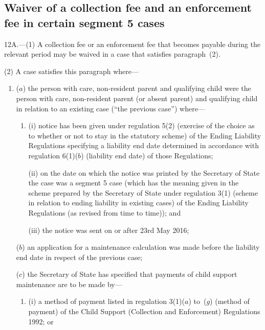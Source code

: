 \documentclass[12pt,a4paper]{article}
\begin{document}
    \subsection[12A. Waiver of a collection fee and an enforcement fee in certain segment 5 cases]{Waiver of a collection fee and an enforcement fee in certain segment 5 cases}

12A.---(1)
    A collection fee or an enforcement fee that becomes payable during the relevant period may be waived in a case that satisfies paragraph~(2).

    (2)
    A case satisfies this paragraph where—
\begin{enumerate}\item[]
    ($a$)
    the person with care, non-resident parent and qualifying child were the person with care, non-resident parent (or absent parent) and qualifying child in relation to an existing case (“the previous case”) where—
\begin{enumerate}\item[]
    (i)
    notice has been given under regulation 5(2) (exercise of the choice as to whether or not to stay in the statutory scheme) of the Ending Liability Regulations specifying a liability end date determined in accordance with regulation 6(1)($b$) (liability end date) of those Regulations;

    (ii)
    on the date on which the notice was printed by the Secretary of State the case was a segment 5 case (which has the meaning given in the scheme prepared by the Secretary of State under regulation 3(1) (scheme in relation to ending liability in existing cases) of the Ending Liability Regulations (as revised from time to time)); and
    
(iii)
    the notice was sent on or after 23rd May 2016;
\end{enumerate}

    ($b$)
    an application for a maintenance calculation was made before the liability end date in respect of the previous case;

    ($c$)
    the Secretary of State has specified that payments of child support maintenance are to be made by—
\begin{enumerate}\item[]
\begin{sloppypar}
    (i)
    a method of payment listed in regulation 3(1)($a$) to~($g$) (method of payment) of the Child Support (Collection and Enforcement) Regulations 1992; or
\end{sloppypar}


\end{enumerate}
\end{enumerate}
\end{document}
